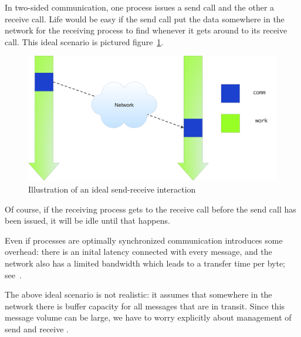 In two-sided communication, one process issues a send call and the
other a receive call. Life would be easy if the send call put the data
somewhere in the network for the receiving process to find whenever it
gets around to its receive call. This ideal scenario is pictured
figure~\ref{fig:send-ideal}.
\begin{figure}[ht]
\includegraphics[scale=.1]{graphics-public/send-ideal}
\caption{Illustration of an ideal send-receive interaction}
\label{fig:send-ideal}
\end{figure}
Of course, if the receiving process gets to the receive call before
the send call has been issued, it will be idle until that happens.

Even if processes are optimally synchronized communication introduces
some overhead: there is an inital latency connected with every
message, and the network also has a limited bandwidth which leads to a
transfer time per byte; see~.

The above ideal scenario is not realistic: it assumes that somewhere
in the network there is buffer capacity for all messages that are in
transit. Since this message volume can be large, we have to worry
explicitly about management of send and receive .

